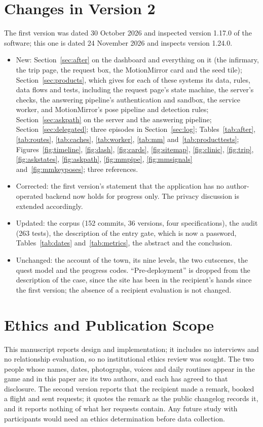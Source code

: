 \documentclass[sigconf,nonacm]{acmart}
\begin{document}
\section{Changes in Version 2}\label{sec:v2}
The first version was dated 30 October 2026 and inspected version 1.17.0 of the software; this
one is dated 24 November 2026 and inspects version 1.24.0.
\begin{itemize}[leftmargin=*,itemsep=1pt,topsep=2pt]
  \item New: Section~\ref{sec:after} on the dashboard and everything on it (the infirmary, the
  trip page, the request box, the MotionMirror card and the seed tile);
  Section~\ref{sec:products}, which gives for each of these systems its data, rules, data flows
  and tests, including the request page's state machine, the server's checks, the answering
  pipeline's authentication and sandbox, the service worker, and MotionMirror's pose pipeline
  and detection rules;
  Section~\ref{sec:askpath} on the server and the answering pipeline; Section~\ref{sec:delegated};
  three episodes in Section~\ref{sec:log}; Tables~\ref{tab:after}, \ref{tab:routes}, \ref{tab:caches}, \ref{tab:worker}, \ref{tab:mm}
  and~\ref{tab:producttests}; Figures~\ref{fig:timeline}, \ref{fig:dash}, \ref{fig:cards},
  \ref{fig:sitemap}, \ref{fig:clinic}, \ref{fig:trip}, \ref{fig:askstates}, \ref{fig:askpath},
  \ref{fig:mmpipe}, \ref{fig:mmsignals} and~\ref{fig:mmkeyposes}; three references.
  \item Corrected: the first version's statement that the application has no author-operated
  backend now holds for progress only. The privacy discussion is extended accordingly.
  \item Updated: the corpus (152 commits, 36 versions, four specifications), the audit (263
  tests), the description of the entry gate, which is now a password, Tables~\ref{tab:dates} and~\ref{tab:metrics}, the abstract and the conclusion.
  \item Unchanged: the account of the town, its nine levels, the two cutscenes, the quest model
  and the progress codes. ``Pre-deployment'' is dropped from the description of the case, since
  the site has been in the recipient's hands since the first version; the absence of a recipient
  evaluation is not changed.
\end{itemize}

\section*{Ethics and Publication Scope}
This manuscript reports design and implementation; it includes no interviews and no relationship
evaluation, so no institutional ethics review was sought. The two people whose names, dates,
photographs, voices and daily routines appear in the game and in this paper are its two authors,
and each has agreed to that disclosure. The second version reports that the recipient made a
remark, booked a flight and sent requests; it quotes the remark as the public changelog records
it, and it reports nothing of what her requests contain. Any future study with participants
would need an ethics determination before data collection.
\end{document}
